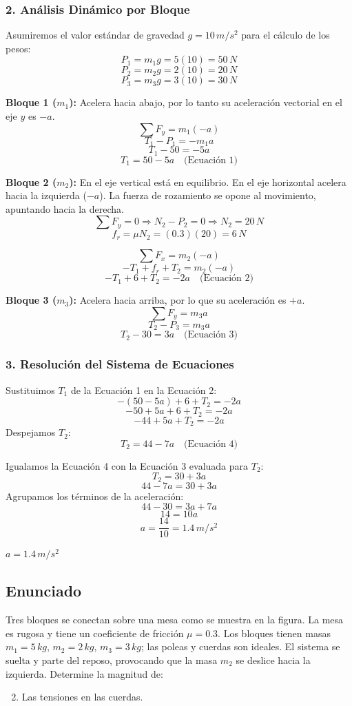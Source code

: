 \documentclass[12pt, a4paper]{article}
\begin{document}
\subsubsection*{2. Análisis Dinámico por Bloque}
Asumiremos el valor estándar de gravedad $g = 10 \, \si{m/s^2}$ para el cálculo de los pesos:
$$ P_1 = m_1 g = 5(10) = 50 \, \si{N} $$
$$ P_2 = m_2 g = 2(10) = 20 \, \si{N} $$
$$ P_3 = m_3 g = 3(10) = 30 \, \si{N} $$

\textbf{Bloque 1 ($m_1$):}
Acelera hacia abajo, por lo tanto su aceleración vectorial en el eje $y$ es $-a$.
$$ \sum F_y = m_1(-a) $$
$$ T_1 - P_1 = -m_1 a $$
$$ T_1 - 50 = -5a $$
$$ T_1 = 50 - 5a \quad \text{(Ecuación 1)} $$

\textbf{Bloque 2 ($m_2$):}
En el eje vertical está en equilibrio. En el eje horizontal acelera hacia la izquierda ($-a$). La fuerza de rozamiento se opone al movimiento, apuntando hacia la derecha.
$$ \sum F_y = 0 \Rightarrow N_2 - P_2 = 0 \Rightarrow N_2 = 20 \, \si{N} $$
$$ f_r = \mu N_2 = (0.3)(20) = 6 \, \si{N} $$

$$ \sum F_x = m_2(-a) $$
$$ -T_1 + f_r + T_2 = m_2(-a) $$
$$ -T_1 + 6 + T_2 = -2a \quad \text{(Ecuación 2)} $$

\textbf{Bloque 3 ($m_3$):}
Acelera hacia arriba, por lo que su aceleración es $+a$.
$$ \sum F_y = m_3 a $$
$$ T_2 - P_3 = m_3 a $$
$$ T_2 - 30 = 3a \quad \text{(Ecuación 3)} $$

\subsubsection*{3. Resolución del Sistema de Ecuaciones}
Sustituimos $T_1$ de la Ecuación 1 en la Ecuación 2:
$$ -(50 - 5a) + 6 + T_2 = -2a $$
$$ -50 + 5a + 6 + T_2 = -2a $$
$$ -44 + 5a + T_2 = -2a $$
Despejamos $T_2$:
$$ T_2 = 44 - 7a \quad \text{(Ecuación 4)} $$

Igualamos la Ecuación 4 con la Ecuación 3 evaluada para $T_2$:
$$ T_2 = 30 + 3a $$
$$ 44 - 7a = 30 + 3a $$
Agrupamos los términos de la aceleración:
$$ 44 - 30 = 3a + 7a $$
$$ 14 = 10a $$
$$ a = \frac{14}{10} = 1.4 \, \si{m/s^2} $$

\begin{tcolorbox}[colback=green!5!white, colframe=green!50!black, title=Respuesta Final]
\centering $a = 1.4 \, \si{m/s^2}$
\end{tcolorbox}

\newpage

\subsection*{Enunciado}
Tres bloques se conectan sobre una mesa como se muestra en la figura. La mesa es rugosa y tiene un coeficiente de fricción $\mu = 0.3$. Los bloques tienen masas $m_1 = 5 \, \si{kg}$, $m_2 = 2 \, \si{kg}$, $m_3 = 3 \, \si{kg}$; las poleas y cuerdas son ideales. El sistema se suelta y parte del reposo, provocando que la masa $m_2$ se deslice hacia la izquierda. Determine la magnitud de:
\begin{enumerate}[label=\alph*)]
    \setcounter{enumi}{1}
    \item Las tensiones en las cuerdas.
\end{enumerate}
\end{document}
